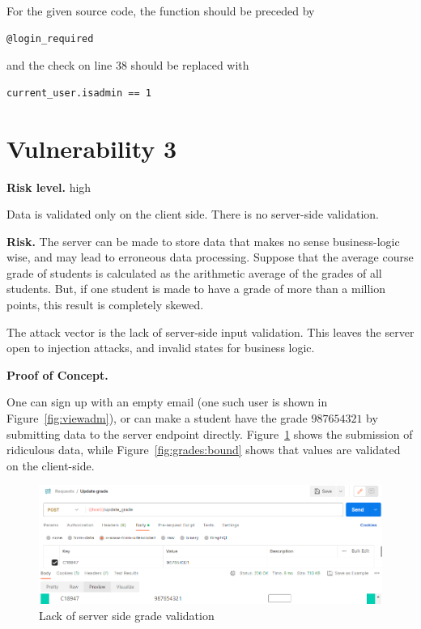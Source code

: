 \documentclass[parskip=half]{scrartcl}
\newcommand{\figref}[1]{Figure~\ref{#1}}
\begin{document}
For the given source code, the function should be preceded by
\begin{verbatim}
@login_required
\end{verbatim}
and the check on line $38$ should be replaced with
\begin{verbatim}
current_user.isadmin == 1
\end{verbatim}


\newpage

\section*{Vulnerability 3}

\textbf{Risk level.} high

Data is validated only on the client side. There is no server-side validation.

\textbf{Risk.} The server can be made to store data that makes no sense
business-logic wise, and may lead to erroneous data processing. Suppose that
the average course grade of students is calculated as the arithmetic average of
the grades of all students. But, if one student is made to have a grade of
more than a million points, this result is completely skewed.

The attack vector is the lack of server-side input validation. This leaves the
server open to injection attacks, and invalid states for business logic.

\textbf{Proof of Concept.}

One can sign up with an empty email (one such user is shown in
\figref{fig:viewadm}), or can make a student have the grade $987654321$ by
submitting data to the server endpoint directly. \figref{fig:grades:absurd}
shows the submission of ridiculous data, while \figref{fig:grades:bound} shows
that values are validated on the client-side.

\begin{figure}
    \centering
    \includegraphics[width=\textwidth]{absurd_grade}
    \caption{Lack of server side grade validation}
    \label{fig:grades:absurd}
\end{figure}
\end{document}

